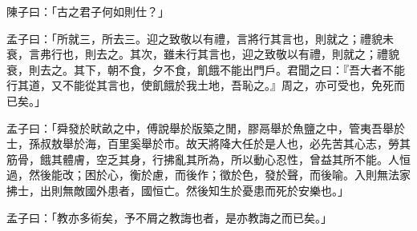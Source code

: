 \documentclass[12pt,a4paper]{ctexbook}
\begin{document}
陳子曰：「古之君子何如則仕？」\par
孟子曰：「所就三，所去三。迎之致敬以有禮，言將行其言也，則就之；禮貌未衰，言弗行也，則去之。其次，雖未行其言也，迎之致敬以有禮，則就之；禮貌衰，則去之。其下，朝不食，夕不食，飢餓不能出門戶。君聞之曰：『吾大者不能行其道，又不能從其言也，使飢餓於我土地，吾恥之。』周之，亦可受也，免死而已矣。」\par
孟子曰：「舜發於畎畝之中，傅說舉於版築之閒，膠鬲舉於魚鹽之中，管夷吾舉於士，孫叔敖舉於海，百里奚舉於市。故天將降大任於是人也，必先苦其心志，勞其筋骨，餓其體膚，空乏其身，行拂亂其所為，所以動心忍性，曾益其所不能。人恒過，然後能改；困於心，衡於慮，而後作；徵於色，發於聲，而後喻。入則無法家拂士，出則無敵國外患者，國恒亡。然後知生於憂患而死於安樂也。」\par
孟子曰：「教亦多術矣，予不屑之教誨也者，是亦教誨之而已矣。」\par
\end{document}
